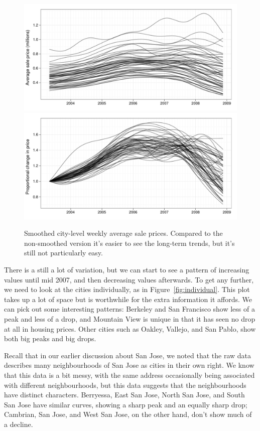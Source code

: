 \documentclass[oneside]{article}
\begin{document}
\begin{figure}[htbp]
  \centering
  \includegraphics[width=0.5 \linewidth]{cities-smooth}%
  \includegraphics[width=0.5 \linewidth]{cities-indexed}
  \caption{Smoothed city-level weekly average sale prices.  Compared to the non-smoothed version it's easier to see the long-term trends, but it's still not particularly easy.}
  \label{fig:smoothed}
\end{figure}

There is a still a lot of variation, but we can start to see a pattern of increasing values until mid 2007, and then decreasing values afterwards.  To get any further, we need to look at the cities individually, as in Figure~\ref{fig:individual}.  This plot takes up a lot of space but is worthwhile for the extra information it affords.  We can pick out some interesting patterns: Berkeley and San Francisco show less of a peak and less of a drop, and Mountain View is unique in that it has seen no drop at all in housing prices.  Other cities such as Oakley, Vallejo, and San Pablo, show both big peaks and big drops.


Recall that in our earlier discussion about San Jose, we noted that the raw data describes many neighbourhoods of San Jose as cities in their own right.  We know that this data is a bit messy, with the same address occasionally being associated with different neighbourhoods, but this data suggests that the neighbourhoods have distinct characters.  Berryessa, East San Jose, North San Jose, and South San Jose have similar curves, showing a sharp peak and an equally sharp drop;  Cambrian, San Jose, and West San Jose, on the other hand, don't show much of a decline.
\end{document}
